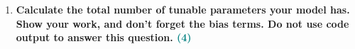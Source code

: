 \documentclass[a4paper]{article}
\begin{document}
\begin{sloppypar}
\begin{enumerate}[start=4,label=Q\arabic*,left=0pt]
    \par 

    \item \textbf{Calculate the total number of tunable parameters your model has. Show your work,
    and don’t forget the bias terms. Do not use code output to answer this question. \hfill \textcolor{teal}{(4)}}

    \par 

\end{enumerate}
\end{sloppypar}



\end{document}
